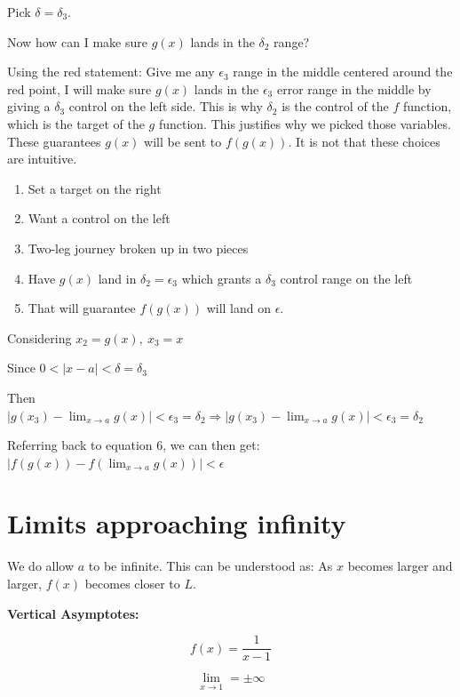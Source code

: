 \documentclass[
]{article}
\begin{document}
Pick $\delta = \delta_{3}$.

Now how can I make sure $g(x)$ lands in the $\delta_{2}$ range?

Using the red statement: Give me any $\epsilon_{3}$ range in the
middle centered around the red point, I will make sure $g(x)$ lands in
the $\epsilon_{3}$ error range in the middle by giving a
$\delta_{3}$ control on the left side. This is why $\delta_{2}$ is
the control of the $f$ function, which is the target of the $g$
function. This justifies why we picked those variables. These guarantees
$g(x)$ will be sent to $f\left( g(x) \right)$. It is not that these
choices are intuitive.

\begin{enumerate}
\def\labelenumi{\arabic{enumi}.}
\item
  Set a target on the right
\item
  Want a control on the left
\item
  Two-leg journey broken up in two pieces
\item
  Have $g(x)$ land in $\delta_{2} = \epsilon_{3}$ which grants a
  $\delta_{3}$ control range on the left
\item
  That will guarantee $f\left( g(x) \right)$ will land on
  $\epsilon$.
\end{enumerate}

Considering $x_{2} = g(x),\ x_{3} = x$

Since $0 < |x - a| < \delta = \delta_{3}$

Then
$\left| g\left( x_{3} \right) - \lim_{x \rightarrow a}{g(x)} \right| < \epsilon_{3} = \delta_{2} \Rightarrow \left| g(x_{3}) - \lim_{x \rightarrow a}{g(x)} \right| < \epsilon_{3} = \delta_{2}$

Referring back to equation 6, we can then get:
$\left| f\left( g(x) \right) - f\left( \lim_{x \rightarrow a}{g(x)} \right) \right| < \epsilon$


\section{Limits approaching
infinity}

We do allow $a$ to be infinite. This can be understood as: As $x$
becomes larger and larger, $f(x)$ becomes closer to $L$.

\textbf{Vertical Asymptotes:}

$$f(x) = \frac{1}{x - 1}$$

$$\lim_{x \rightarrow 1}{= \pm \infty}$$
\end{document}
